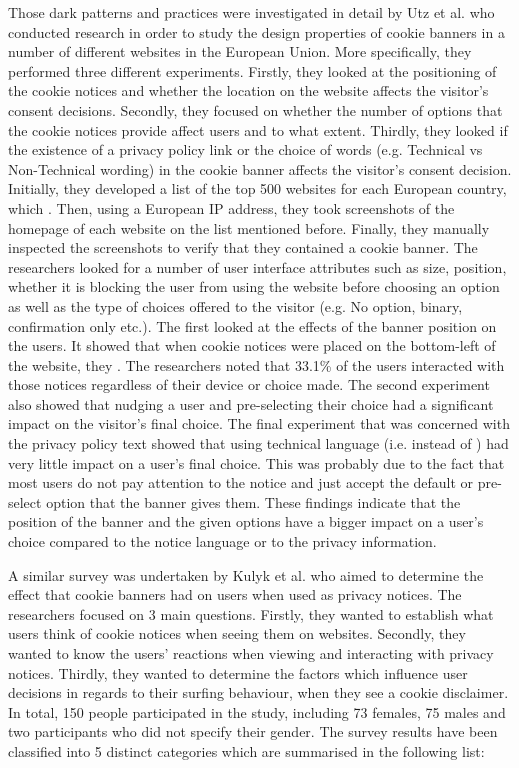 \documentclass[../main.tex]{subfiles}
\begin{document}
Those dark patterns and practices were investigated in detail by Utz et al. \cite{utz2019informed} who conducted research in order to study the design properties of cookie banners in a number of different websites in the European Union. More specifically, they performed three different experiments. Firstly, they looked at the positioning of the cookie notices and whether the location on the website affects the visitor’s consent decisions. Secondly, they focused on whether the number of options that the cookie notices provide affect users and to what extent. Thirdly, they looked if the existence of a privacy policy link or the choice of words (e.g. Technical vs Non-Technical wording) in the cookie banner affects the visitor’s consent decision. Initially, they developed a list of the top 500 websites for each European country, which . Then, using a European IP address, they took screenshots of the homepage of each website on the list mentioned before. Finally, they manually inspected the screenshots to verify that they contained a cookie banner. The researchers looked for a number of user interface attributes such as size, position, whether it is blocking the user from using the website before choosing an option as well as the type of choices offered to the visitor (e.g. No option, binary, confirmation only etc.). The first looked at the effects of the banner position on the users. It showed that when cookie notices were placed on the bottom-left of the website, they . The researchers noted that 33.1\% of the users interacted with those notices regardless of their device or choice made. The second experiment also showed that nudging a user and pre-selecting their choice had a significant impact on the visitor’s final choice. The final experiment that was concerned with the privacy policy text showed that using technical language (i.e.  instead of ) had very little impact on a user’s final choice. This was probably due to the fact that most users do not pay attention to the notice and just accept the default or pre-select option that the banner gives them. These findings indicate that the position of the banner and the given options have a bigger impact on a user’s choice compared to the notice language or to the privacy information. 

A similar survey was undertaken by Kulyk et al. \cite{kulyk2018website} who aimed to determine the effect that cookie banners had on users when used as privacy notices. The researchers focused on 3 main questions. Firstly, they wanted to establish what users think of cookie notices when seeing them on websites. Secondly, they wanted to know the users’ reactions when viewing and interacting with privacy notices. Thirdly, they wanted to determine the factors which influence user decisions in regards to their surfing behaviour, when they see a cookie disclaimer. In total, 150 people participated in the study, including 73 females, 75 males and two participants who did not specify their gender. The survey results have been classified into 5 distinct categories which are summarised in the following list:
\end{document}
